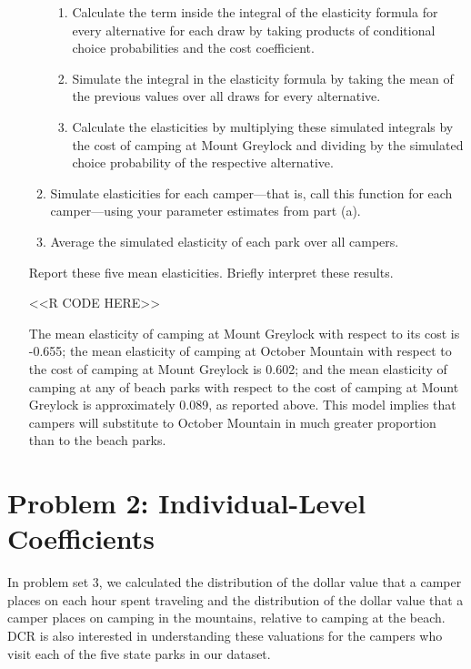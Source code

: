 \documentclass[11pt,letterpaper]{article}
\begin{document}
\begin{enumerate}[label=\alph*., leftmargin=*]
\begin{enumerate}[label=\Roman*.]
\begin{enumerate}[label=\roman*.]
			\item Calculate the term inside the integral of the elasticity formula for every alternative for each draw by taking products of conditional choice probabilities and the cost coefficient.
			\item Simulate the integral in the elasticity formula by taking the mean of the previous values over all draws for every alternative.
			\item Calculate the elasticities by multiplying these simulated integrals by the cost of camping at Mount Greylock and dividing by the simulated choice probability of the respective alternative.
		\end{enumerate}
		\item Simulate elasticities for each camper---that is, call this function for each camper---using your parameter estimates from part (a).
		\item Average the simulated elasticity of each park over all campers.
	\end{enumerate}
	Report these five mean elasticities. Briefly interpret these results.

	<<R CODE HERE>>

	The mean elasticity of camping at Mount Greylock with respect to its cost is -0.655; the mean elasticity of camping at October Mountain with respect to the cost of camping at Mount Greylock is 0.602; and the mean elasticity of camping at any of beach parks with respect to the cost of camping at Mount Greylock is approximately 0.089, as reported above. This model implies that campers will substitute to October Mountain in much greater proportion than to the beach parks.
\end{enumerate}

\section*{Problem 2: Individual-Level Coefficients}

In problem set 3, we calculated the distribution of the dollar value that a camper places on each hour spent traveling and the distribution of the dollar value that a camper places on camping in the mountains, relative to camping at the beach. DCR is also interested in understanding these valuations for the campers who visit each of the five state parks in our dataset. 
\end{document}
